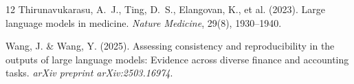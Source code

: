 \documentclass[11pt]{article}
\begin{document}
\begin{thebibliography}{12}
Thirunavukarasu, A.~J., Ting, D.~S., Elangovan, K., et al. (2023).
\newblock Large language models in medicine.
\newblock \textit{Nature Medicine}, 29(8), 1930--1940.

Wang, J. \& Wang, Y. (2025).
\newblock Assessing consistency and reproducibility in the outputs of large language models: Evidence across diverse finance and accounting tasks.
\newblock \textit{arXiv preprint arXiv:2503.16974}.

\end{thebibliography}
\end{document}

